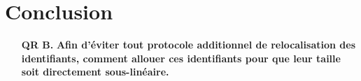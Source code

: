 
\section{Conclusion}
\label{repl:sec:conclusion}


\begin{itemize}
\item [\textbf{QR B.}] \textbf{Afin d'éviter tout protocole additionnel de
    relocalisation des identifiants, comment allouer ces identifiants pour que
    leur taille soit directement sous-linéaire.}
\end{itemize}